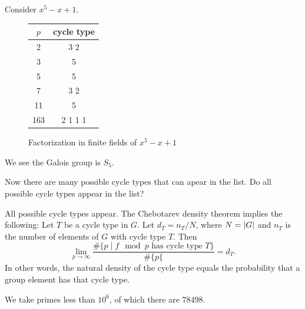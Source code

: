\documentclass[10pt, twoside]{article}
\begin{document}
        \begin{exm}
            Consider $x^5-x+1$.
            \begin{figure}[H]
                \begin{center}
                    \begin{tabular}{cc}
                        \toprule
                        $p$ & cycle type \\
                        \midrule
                        2 & 3 2 \\
                        3 & 5 \\
                        5 & 5 \\
                        7 & 3 2 \\
                        11 & 5 \\
                        163 & 2 1 1 1 \\
                        \bottomrule
                    \end{tabular}
                \end{center}
                \caption{Factorization in finite fields of $x^5-x+1$}%
                \label{fig:factorization-finite-fields-2}
            \end{figure}
            We see the Galois group is $S_5$.
        \end{exm}

        Now there are many possible cycle types that can apear in the list. Do all possible cycle types appear in the list?

        \begin{thm}
            All possible cycle types appear. The Chebotarev density theorem implies the following: Let $T$ be a cycle type in $G$. Let $d_T = n_T/N$, where $N = \lvert G\rvert$ and $n_T$ is the number of elements of $G$ with cycle type $T$. Then \[\lim_{p \to \infty} \frac{\# \{ p \mid f \mod p \text{ has cycle type }T\} }{\# \{p\{} = d_T.\] In other words, the natural density of the cycle type equals the probability that a group element has that cycle type.
        \end{thm}

        We take primes less than $10^6$, of which there are $78498$.
\end{document}
